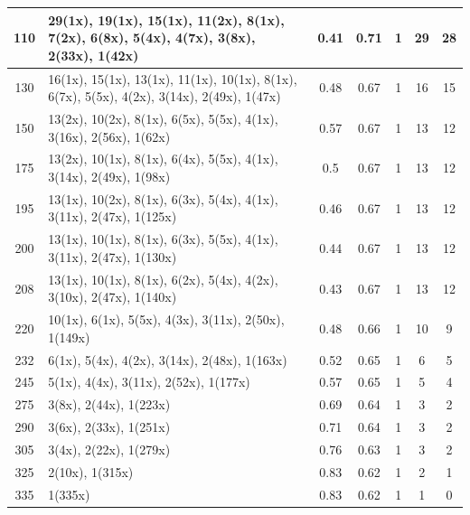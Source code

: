 \begin{small}
\begin{longtable}{|c|p{4cm}|c|c|c|c|c|}
110 & 29(1x), 19(1x), 15(1x), 11(2x), 8(1x), 7(2x), 6(8x), 5(4x), 4(7x), 3(8x), 2(33x), 1(42x) & \cellcolor{colorGood}  0.41 & \cellcolor{colorGood} 0.71 & 1 & 29 & \cellcolor{colorBad} 28 \\   \hline
130 & 16(1x), 15(1x), 13(1x), 11(1x), 10(1x), 8(1x), 6(7x), 5(5x), 4(2x), 3(14x), 2(49x), 1(47x) & \cellcolor{colorGood}  0.48 & \cellcolor{colorGood} 0.67 & 1 & 16 & \cellcolor{colorBad} 15 \\   \hline
150 & 13(2x), 10(2x), 8(1x), 6(5x), 5(5x), 4(1x), 3(16x), 2(56x), 1(62x) & \cellcolor{colorOK}  0.57 & \cellcolor{colorOK} 0.67 & 1 & 13 & \cellcolor{colorGood} 12 \\   \hline
175 & 13(2x), 10(1x), 8(1x), 6(4x), 5(5x), 4(1x), 3(14x), 2(49x), 1(98x) & \cellcolor{colorGood}  0.5 & \cellcolor{colorGood} 0.67 & 1 & 13 & \cellcolor{colorGood} 12 \\   \hline
195 & 13(1x), 10(2x), 8(1x), 6(3x), 5(4x), 4(1x), 3(11x), 2(47x), 1(125x) & \cellcolor{colorGood}  0.46 & \cellcolor{colorGood} 0.67 & 1 & 13 & \cellcolor{colorGood} 12 \\   \hline
200 & 13(1x), 10(1x), 8(1x), 6(3x), 5(5x), 4(1x), 3(11x), 2(47x), 1(130x) & \cellcolor{colorGood}  0.44 & \cellcolor{colorGood} 0.67 & 1 & 13 & \cellcolor{colorGood} 12 \\   \hline
208 & 13(1x), 10(1x), 8(1x), 6(2x), 5(4x), 4(2x), 3(10x), 2(47x), 1(140x) & \cellcolor{colorGood}  0.43 & \cellcolor{colorGood} 0.67 & 1 & 13 & \cellcolor{colorGood} 12 \\   \hline
220 & 10(1x), 6(1x), 5(5x), 4(3x), 3(11x), 2(50x), 1(149x) & \cellcolor{colorGood}  0.48 & \cellcolor{colorGood} 0.66 & 1 & 10 & \cellcolor{colorGood} 9 \\   \hline
232 & 6(1x), 5(4x), 4(2x), 3(14x), 2(48x), 1(163x) & \cellcolor{colorGood}  0.52 & \cellcolor{colorGood} 0.65 & 1 & 6 & \cellcolor{colorGood} 5 \\   \hline
245 & 5(1x), 4(4x), 3(11x), 2(52x), 1(177x) & \cellcolor{colorOK}  0.57 & \cellcolor{colorOK} 0.65 & 1 & 5 & \cellcolor{colorGood} 4 \\   \hline
275 & 3(8x), 2(44x), 1(223x) & \cellcolor{colorBad}  0.69 & \cellcolor{colorBad} 0.64 & 1 & 3 & \cellcolor{colorGood} 2 \\   \hline
290 & 3(6x), 2(33x), 1(251x) & \cellcolor{colorBad}  0.71 & \cellcolor{colorBad} 0.64 & 1 & 3 & \cellcolor{colorGood} 2 \\   \hline
305 & 3(4x), 2(22x), 1(279x) & \cellcolor{colorBad}  0.76 & \cellcolor{colorBad} 0.63 & 1 & 3 & \cellcolor{colorGood} 2 \\   \hline
325 & 2(10x), 1(315x) & \cellcolor{colorBad}  0.83 & \cellcolor{colorBad} 0.62 & 1 & 2 & \cellcolor{colorGood} 1 \\   \hline
335 & 1(335x) & \cellcolor{colorBad}  0.83 & \cellcolor{colorBad} 0.62 & 1 & 1 & \cellcolor{colorGood} 0 \\   \hline
\end{longtable}
\end{small}
\endgroup

